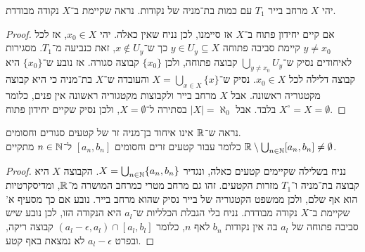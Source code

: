 \question{}
\subquestion{}
יהי $X$ מרחב בייר $T_1$ עם כמות בת־מניה של נקודות.
נראה שקיימת ב־$X$ נקודה מבודדת.
\begin{proof}
	אם קיים יחידון פתוח ב־$X$ אז סיימנו, לכן נניח שאין כאלה.
	יהי $x_0 \in X$, אז לכל $y \ne x_0$ קיימת סביבה פתוחה $y \in U_y \subseteq X$ כך ש־$x \notin U_y$, זאת כנביעה מ־$T_1$.
	מסגירות לאיחודים נסיק ש־$\bigcup_{y \ne x_0} U_y$ קבוצה פתוחה, ולכן $\{ x_0 \}$ קבוצה סגורה.
	אז נובע ש־$\{ x_0 \}$ היא קבוצה דלילה לכל $x_0 \in X$.
	נסיק ש־$X = \bigcup_{x \in X} \{ x \}$ והעובדה ש־$X$ בת־מניה כי היא קבוצה מקטגוריה ראשונה.
	אבל $X$ מרחב בייר ולקבוצות מקטגוריה ראשונה אין פנים, כלומר $X^\circ = X = \emptyset$ בלבד.
	אבל $|X| = \aleph_0$ בסתירה ל־$X = \emptyset$, ולכן נסיק שקיים יחידון פתוח.
\end{proof}

\subquestion{}
נראה ש־$\mathbb{R}$ אינו איחוד בן־מניה זר של קטעים סגורים וחסומים. \\
כלומר עבור קטעים זרים וחסומים $[a_n, b_n]$ ל־$n \in \mathbb{N}$ מתקיים $\mathbb{R} \setminus \bigcup_{n \in \mathbb{N}} [a_n, b_n] \ne \emptyset$.
\begin{proof}
	נניח בשלילה שקיימים קטעים כאלה, ונגדיר $X = \bigcup_{n \in \mathbb{N}} \{ a_n, b_n \}$.
	הקבוצה $X$ היא קבוצה בת־מניה ו־$T_1$ מזרות הקטעים.
	זהו גם מרחב מטרי כמרחב המושרה מ־$\mathbb{R}$, ומדיסקרטיות הוא אף שלם, ולכן ממשפט הקטגוריה של בייר נסיק שהוא מרחב בייר.
	נובע אם כך מסעיף א' שקיימת ב־$X$ נקודה מבודדת.
	נניח בלי הגבלת הכלליות ש־$a_l$ היא הנקודה הזו, לכן נובע שיש סביבה פתוחה של $a_l$ בה אין נקודות $b_n$ לאף $n$, כלומר $(a_l - \epsilon, a_l) \cap [a_l, b_l]$ קבוצה ריקה, ובפרט $a_l - \epsilon$ לא נמצאת באף קטע.
\end{proof}


